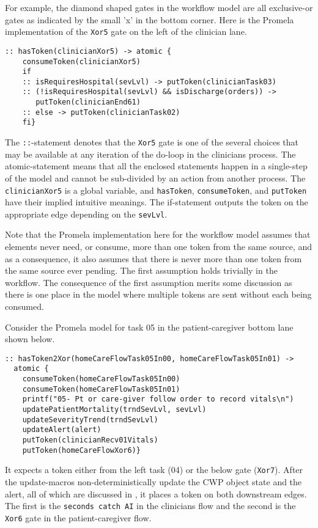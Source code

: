 For example, the diamond shaped gates in the workflow model are all exclusive-or gates as indicated by the small 'x' in the bottom corner. Here is the Promela implementation of the \texttt{Xor5} gate on the left of the clinician lane.
%
{\small
\begin{lstlisting}[style=myPromela]
:: hasToken(clinicianXor5) -> atomic { 
    consumeToken(clinicianXor5)
    if
    :: isRequiresHospital(sevLvl) -> putToken(clinicianTask03)
    :: (!isRequiresHospital(sevLvl) && isDischarge(orders)) -> 
       putToken(clinicianEnd61)
    :: else -> putToken(clinicianTask02)
    fi}
\end{lstlisting}
}
% 
\noindent The \texttt{::}-statement denotes that the \texttt{Xor5} gate is one of the several choices that may be available at any iteration of the do-loop in the clinicians process. The atomic-statement means that all the enclosed statements happen in a single-step of the model and cannot be sub-divided by an action from another process.
The \texttt{clinicianXor5} is a global variable, and \texttt{hasToken}, \texttt{consumeToken}, and \texttt{putToken} have their implied intuitive meanings. The if-statement outputs the token on the appropriate edge depending on the \texttt{sevLvl}. 

Note that the Promela implementation here for the workflow model assumes that elements never need, or consume, more than one token from the same source, and as a consequence, it also assumes that there is never more than one token from the same source ever pending. The first assumption holds trivially in the workflow. The consequence of the first assumption merits some discussion as there is one place in the model where multiple tokens are sent without each being consumed.

Consider the Promela model for task 05 in the patient-caregiver bottom lane shown below.
%
{\small
\begin{lstlisting}[style=myPromela]
:: hasToken2Xor(homeCareFlowTask05In00, homeCareFlowTask05In01) -> 
  atomic {
    consumeToken(homeCareFlowTask05In00)
    consumeToken(homeCareFlowTask05In01)
    printf("05- Pt or care-giver follow order to record vitals\n")
    updatePatientMortality(trndSevLvl, sevLvl)
    updateSeverityTrend(trndSevLvl)
    updateAlert(alert)
    putToken(clinicianRecv01Vitals)
    putToken(homeCareFlowXor6)}
\end{lstlisting}
}
%
\noindent It expects a token either from the left task (04) or the below gate (\texttt{Xor7}). After the update-macros non-deterministically update the CWP object state and the alert, all of which are discussed in , it places a token on both downstream edges. The first is the \texttt{seconds catch AI} in the clinicians flow and the second is the \texttt{Xor6} gate in the patient-caregiver flow. 

